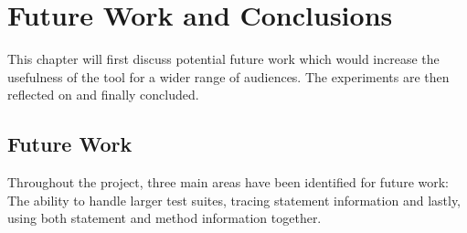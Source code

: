 \chapter{Future Work and Conclusions}\label{C:future}

This chapter will first discuss potential future work which would increase the usefulness of the tool for a wider range of audiences. The experiments are then reflected on and finally concluded. 

\section{Future Work}
Throughout the project, three main areas have been identified for future work: The ability to handle larger test suites, tracing statement information and lastly, using both statement and method information together.

